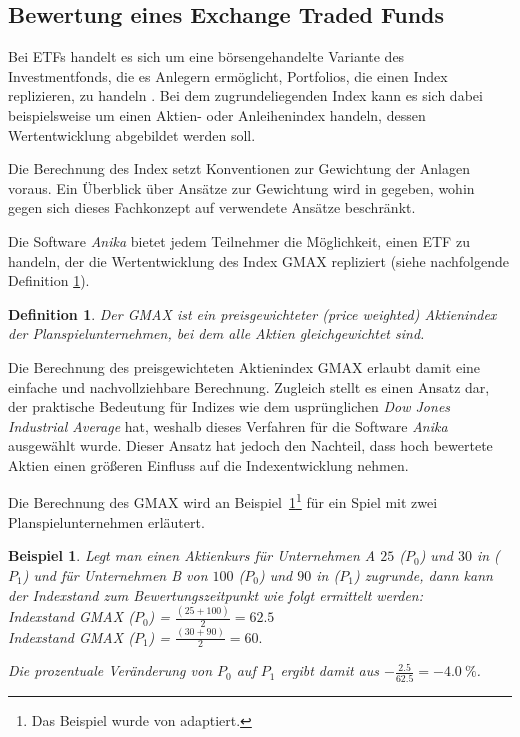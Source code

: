 \documentclass[12pt, a4paper]{article}
\theoremstyle{plain}
\newtheorem{definition}{Definition}
\newtheorem{example}{Beispiel}
\begin{document}
\subsection{Bewertung eines Exchange Traded Funds}
\label{sec:bewertung_eines_exchange_traded_funds}

Bei \glspl{ETF} handelt es sich um eine börsengehandelte Variante des Investmentfonds, die es Anlegern ermöglicht, Portfolios, die einen Index replizieren, zu handeln \autocite[][S.~103]{bodie_investments_2018}. Bei dem zugrundeliegenden Index kann es sich dabei beispielsweise um einen Aktien- oder Anleihenindex handeln, dessen Wertentwicklung abgebildet werden soll.

Die Berechnung des Index setzt Konventionen zur Gewichtung der Anlagen voraus. Ein Überblick über Ansätze zur Gewichtung wird in \textcite[][S.~44~ff.]{bodie_investments_2018} gegeben, wohin gegen sich dieses Fachkonzept auf verwendete Ansätze beschränkt.

Die Software \textit{Anika} bietet jedem Teilnehmer die Möglichkeit, einen ETF zu handeln, der die Wertentwicklung des Index \gls{GMAX} repliziert (siehe nachfolgende Definition \ref{def:gmax}).

\begin{definition}
	\label{def:gmax}
	Der \gls{GMAX} ist ein preisgewichteter (\textit{price weighted}) Aktienindex der Planspielunternehmen, bei dem alle Aktien gleichgewichtet sind.
\end{definition}

Die Berechnung des preisgewichteten Aktienindex \gls{GMAX} erlaubt damit eine einfache und nachvollziehbare Berechnung. Zugleich stellt es einen Ansatz dar, der praktische Bedeutung für Indizes wie dem usprünglichen \textit{Dow Jones Industrial Average} hat, weshalb dieses Verfahren für die Software \textit{Anika} ausgewählt wurde. Dieser Ansatz hat jedoch den Nachteil, dass hoch bewertete Aktien einen größeren Einfluss auf die Indexentwicklung nehmen.

Die Berechnung des \gls{GMAX} wird an Beispiel~\ref{ex:gmax}\footnote{Das Beispiel wurde von \textcite[][S.~44]{bodie_investments_2018} adaptiert.} für ein Spiel mit zwei Planspielunternehmen erläutert.

\begin{example}
\label{ex:gmax}
Legt man einen Aktienkurs für Unternehmen A $25$ ($P_0$) und $30$ in ($P_1$) und für Unternehmen B von $100$ ($P_0$) und $90$ in ($P_1$) zugrunde, dann kann der Indexstand zum Bewertungszeitpunkt wie folgt ermittelt werden:\\
Indexstand \gls{GMAX} ($P_0$) = $\frac{(25 + 100)}{2} = 62.5$\\
Indexstand \gls{GMAX} ($P_1$) = $\frac{(30 + 90)}{2} = 60.$

Die prozentuale Veränderung von $P_0$ auf $P_1$ ergibt damit aus $-\frac{2.5}{62.5} = -4.0~\%$.
\end{example}
\end{document}
